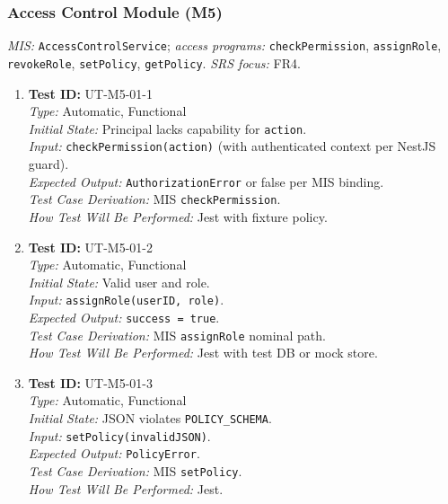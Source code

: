 \documentclass[12pt, titlepage]{article}
\begin{document}
\subsubsection{Access Control Module (M5)}

\textit{MIS:} \texttt{AccessControlService}; \textit{access programs:} \texttt{checkPermission}, \texttt{assignRole}, \texttt{revokeRole}, \texttt{setPolicy}, \texttt{getPolicy}. \textit{SRS focus:} FR4.

\begin{enumerate}\setlength{\itemsep}{0.85em}
    \item \textbf{Test ID:} UT-M5-01-1\\[0.25em]
    \textit{Type:} Automatic, Functional\\
    \textit{Initial State:} Principal lacks capability for \texttt{action}.\\
    \textit{Input:} \texttt{checkPermission(action)} (with authenticated context per NestJS guard).\\
    \textit{Expected Output:} \texttt{AuthorizationError} or false per MIS binding.\\
    \textit{Test Case Derivation:} MIS \texttt{checkPermission}.\\
    \textit{How Test Will Be Performed:} Jest with fixture policy.

    \item \textbf{Test ID:} UT-M5-01-2\\[0.25em]
    \textit{Type:} Automatic, Functional\\
    \textit{Initial State:} Valid user and role.\\
    \textit{Input:} \texttt{assignRole(userID, role)}.\\
    \textit{Expected Output:} \texttt{success = true}.\\
    \textit{Test Case Derivation:} MIS \texttt{assignRole} nominal path.\\
    \textit{How Test Will Be Performed:} Jest with test DB or mock store.

    \item \textbf{Test ID:} UT-M5-01-3\\[0.25em]
    \textit{Type:} Automatic, Functional\\
    \textit{Initial State:} JSON violates \texttt{POLICY\_SCHEMA}.\\
    \textit{Input:} \texttt{setPolicy(invalidJSON)}.\\
    \textit{Expected Output:} \texttt{PolicyError}.\\
    \textit{Test Case Derivation:} MIS \texttt{setPolicy}.\\
    \textit{How Test Will Be Performed:} Jest.
\end{enumerate}
\end{document}
